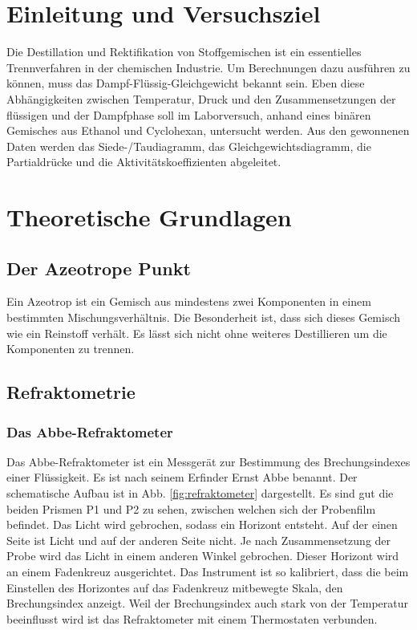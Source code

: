 \section{Einleitung und Versuchsziel}
\label{sec:aufgabenstellung}
Die Destillation und Rektifikation von Stoffgemischen ist ein essentielles Trennverfahren in der chemischen Industrie. Um Berechnungen dazu ausführen zu können, muss das Dampf-Flüssig-Gleichgewicht bekannt sein. Eben diese Abhängigkeiten zwischen Temperatur, Druck und den Zusammensetzungen der flüssigen und der Dampfphase soll im Laborversuch, anhand eines binären Gemisches aus Ethanol und Cyclohexan, untersucht werden. Aus den gewonnenen Daten werden das Siede-/Taudiagramm, das Gleichgewichtsdiagramm, die Partialdrücke und die Aktivitätskoeffizienten abgeleitet. 

\section{Theoretische Grundlagen}

\subsection{Der Azeotrope Punkt}
Ein Azeotrop ist ein Gemisch aus mindestens zwei Komponenten in einem bestimmten Mischungsverhältnis. Die Besonderheit ist, dass sich dieses Gemisch wie ein Reinstoff verhält. Es lässt sich nicht ohne weiteres Destillieren um die Komponenten zu trennen.
\subsection{Refraktometrie}
\subsubsection*{Das Abbe-Refraktometer}
Das Abbe-Refraktometer ist ein Messgerät zur Bestimmung des Brechungsindexes einer Flüssigkeit. Es ist nach seinem Erfinder Ernst Abbe benannt. Der schematische Aufbau ist in Abb. \ref{fig:refraktometer} dargestellt. Es sind gut die beiden Prismen P1 und P2 zu sehen, zwischen welchen sich der Probenfilm befindet. Das Licht wird gebrochen, sodass ein Horizont entsteht. Auf der einen Seite ist Licht und auf der anderen Seite nicht. Je nach Zusammensetzung der Probe wird das Licht in einem anderen Winkel gebrochen. Dieser Horizont wird an einem Fadenkreuz ausgerichtet. Das Instrument ist so kalibriert, dass die beim Einstellen des Horizontes auf das Fadenkreuz mitbewegte Skala, den Brechungsindex anzeigt. 
Weil der Brechungsindex auch stark von der Temperatur beeinflusst wird ist das Refraktometer mit einem Thermostaten verbunden.

